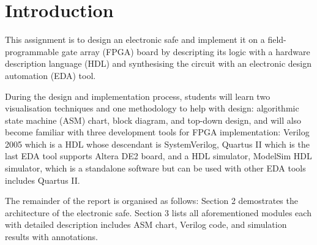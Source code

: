 \section{Introduction}

This assignment is to design an electronic safe and implement it on a field-programmable gate array (FPGA) board by descripting its logic with a hardware description language (HDL) and synthesising the circuit with an electronic design automation (EDA) tool.

During the design and implementation process, students will learn two visualisation techniques and one methodology to help with design: algorithmic state machine (ASM) chart, block diagram, and top-down design, and will also become familiar with three development tools for FPGA implementation: Verilog 2005 which is a HDL whose descendant is SystemVerilog, Quartus II which is the last EDA tool supports Altera DE2 board, and a HDL simulator, ModelSim HDL simulator, which is a standalone software but can be used with other EDA tools includes Quartus II.

The remainder of the report is organised as follows: Section 2 demostrates the architecture of the electronic safe. Section 3 lists all aforementioned modules each with detailed description includes ASM chart, Verilog code, and simulation results with annotations.
